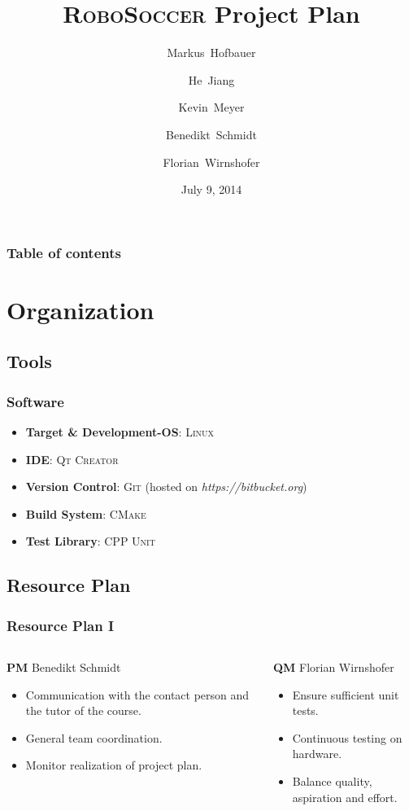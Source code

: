 \documentclass[hyperref={pdfpagelabels=false},compress]{beamer}
\title{\textsc{RoboSoccer} Project Plan}
\author[Hofbauer, Jiang, Meyer, Schmidt, Wirnshofer]{
  Markus~Hofbauer \and
  He~Jiang \and
  Kevin~Meyer \and
  Benedikt~Schmidt \and
  Florian~Wirnshofer
}
\institute
{
	Technische Universität München, Germany
}
\date{July 9, 2014}
\begin{document}
\begin{frame}
	\titlepage
\end{frame}

\begin{frame}
	\frametitle{Table of contents}
	\tableofcontents
\end{frame}

\section{Organization}
\subsection{Tools}
\begin{frame}
	\frametitle{Software}
	\begin{itemize}
		\item  \textbf{Target \& Development-OS}: \textsc{Linux}
		\item  \textbf{IDE}: \textsc{Qt Creator}
		\item  \textbf{Version Control}: \textsc{Git} (hosted on \textit{https://bitbucket.org})
		\item  \textbf{Build System}: \textsc{CMake}
		\item  \textbf{Test Library}: \textsc{CPP Unit}
	\end{itemize}
\end{frame}

\subsection{Resource Plan}
\begin{frame}
	\frametitle{Resource Plan I}
	\begin{columns}[t]
		\begin{column}{0.50\textwidth}
			\begin{block}{\textbf{PM} Benedikt Schmidt}
				\begin{itemize}
					\item Communication with the contact person and the tutor of the course.
					\item General team coordination.
					\item Monitor realization of project plan.
				\end{itemize}
			\end{block}
		\end{column}

		\begin{column}{0.50\textwidth}
			\begin{block}{\textbf{QM} Florian Wirnshofer}
				\begin{itemize}
					\item Ensure sufficient unit tests.
					\item Continuous testing on hardware.
					\item Balance quality, aspiration and effort.
				\end{itemize}
			\end{block}
		\end{column}
	\end{columns}
\end{frame}
\end{document}
